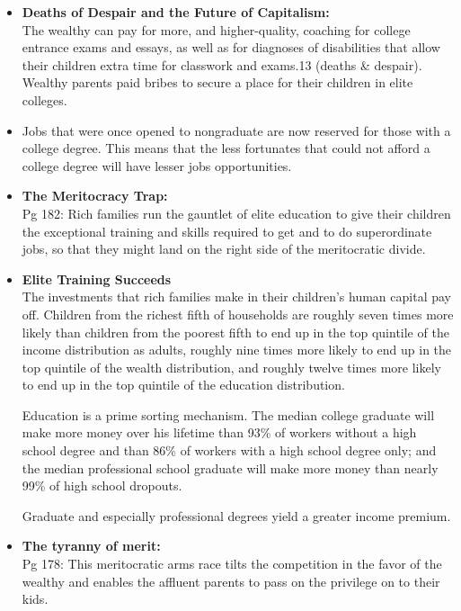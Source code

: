 \documentclass[11pt]{article}
\begin{document}
\begin{itemize}
 \item {
       \textbf{  Deaths of Despair and the Future of Capitalism:}
       \\    The wealthy can pay for more, and higher-quality, coaching for college entrance exams and essays, as well as for diagnoses of disabilities that allow their children extra time for classwork and exams.13  (deaths \& despair).
       Wealthy parents paid bribes to secure a place for their children in elite colleges.
       }
 \item {
       Jobs that were once opened to nongraduate are now reserved for those with a college degree. This means that the less fortunates that could not afford a college degree will have lesser jobs opportunities.
       }
 \item {
       \textbf{The Meritocracy Trap:}
       \\ Pg 182: Rich families run the gauntlet of elite education to give their children the exceptional training and skills required to get and to do superordinate jobs, so that they might land on the right side of the meritocratic divide.
       }
 \item {
       \textbf{Elite Training Succeeds}
       \\ The investments that rich families make in their children’s human capital pay off. Children from the richest fifth of households are roughly seven times more likely than children from the poorest fifth to end up in the top quintile of the income distribution as adults, roughly nine times more likely to end up in the top quintile of the wealth distribution, and roughly twelve times more likely to end up in the top quintile of the education distribution.
       
       Education is a prime sorting mechanism. The median college graduate will make more money over his lifetime than 93\% of workers without a high school degree and than 86\% of workers with a high school degree only; and the median professional school graduate will make more money than nearly 99\% of high school dropouts.
       
       Graduate and especially professional degrees yield a greater income premium.
       }
 \item {
       \textbf{The tyranny of merit: }
       \\ Pg 178: This meritocratic arms race tilts the competition in the favor of the wealthy and enables the affluent parents to pass on the privilege on to their kids.
       
}
\end{itemize}
\end{document}
